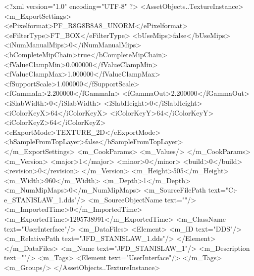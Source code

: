<?xml version="1.0" encoding="UTF-8" ?>
<AssetObjects..TextureInstance>
	<m_ExportSettings>
		<ePixelformat>PF_R8G8B8A8_UNORM</ePixelformat>
		<eFilterType>FT_BOX</eFilterType>
		<bUseMips>false</bUseMips>
		<iNumManualMips>0</iNumManualMips>
		<bCompleteMipChain>true</bCompleteMipChain>
		<fValueClampMin>0.000000</fValueClampMin>
		<fValueClampMax>1.000000</fValueClampMax>
		<fSupportScale>1.000000</fSupportScale>
		<fGammaIn>2.200000</fGammaIn>
		<fGammaOut>2.200000</fGammaOut>
		<iSlabWidth>0</iSlabWidth>
		<iSlabHeight>0</iSlabHeight>
		<iColorKeyX>64</iColorKeyX>
		<iColorKeyY>64</iColorKeyY>
		<iColorKeyZ>64</iColorKeyZ>
		<eExportMode>TEXTURE_2D</eExportMode>
		<bSampleFromTopLayer>false</bSampleFromTopLayer>
	</m_ExportSettings>
	<m_CookParams>
		<m_Values/>
	</m_CookParams>
	<m_Version>
		<major>1</major>
		<minor>0</minor>
		<build>0</build>
		<revision>0</revision>
	</m_Version>
	<m_Height>505</m_Height>
	<m_Width>960</m_Width>
	<m_Depth>1</m_Depth>
	<m_NumMipMaps>0</m_NumMipMaps>
	<m_SourceFilePath text="C:\Users\Deo-e\Desktop\JFD_STANISLAW_1.dds"/>
	<m_SourceObjectName text=""/>
	<m_ImportedTime>0</m_ImportedTime>
	<m_ExportedTime>1295738991</m_ExportedTime>
	<m_ClassName text="UserInterface"/>
	<m_DataFiles>
		<Element>
			<m_ID text="DDS"/>
			<m_RelativePath text="JFD_STANISLAW_1.dds"/>
		</Element>
	</m_DataFiles>
	<m_Name text="JFD_STANISLAW_1"/>
	<m_Description text=""/>
	<m_Tags>
		<Element text="UserInterface"/>
	</m_Tags>
	<m_Groups/>
</AssetObjects..TextureInstance>

